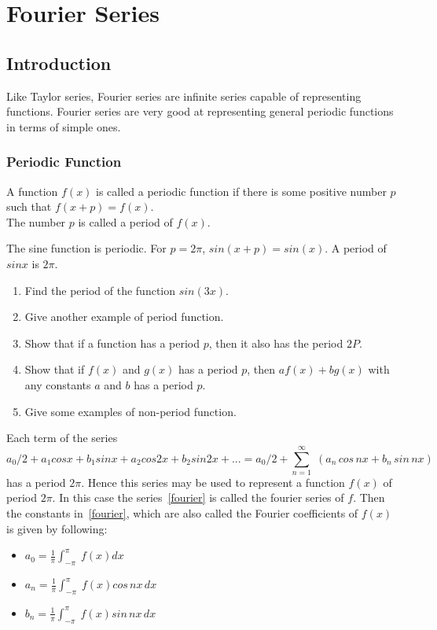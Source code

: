 \documentclass[aima331_lecturenotes_ku.tex]{subfiles}
\begin{document}
\chapter{Fourier Series}

\section{Introduction}
Like Taylor series, Fourier series are infinite series capable of representing functions. Fourier series are very good at representing general periodic functions in terms of simple ones.

\subsection{Periodic Function}
A function $f(x)$ is called a periodic function if there is some positive number $p$ such that $f(x+p)=f(x)$. \\
The number $p$ is called a period of $f(x)$.
\begin{example}
  The sine function is periodic. For $p=2\pi$, $sin(x+p) = sin(x)$. A period of $sinx$ is $2 \pi$.
\end{example}
\begin{enumerate}
\item Find the period of the function $sin(3x)$.
\item Give another example of period function.
\item Show that if a function has a period $p$, then it also has the period $2P$.
\item Show that if $f(x)$ and $g(x)$ has a period $p$, then $af(x)+bg(x)$ with any constants $a$ and $b$ has a period $p$.
\item Give some examples of non-period function.
\end{enumerate}
Each term of the series
\begin{equation}
  \label{fourier}
  a_0/2 + a_1cosx+b_1sinx + a_2cos2x+b_2sin2x + ... = a_0/2 + \sum_{n=1}^{\infty} \; ( a_n\, cos\,nx + b_n \, sin\,nx  )
\end{equation}
has a period $2\pi$. Hence this series may be used to represent a function $f(x)$ of period $2\pi$. In this case the series~\ref{fourier} is called the fourier series of $f$. Then the constants in~\ref{fourier}, which are also called the Fourier coefficients of $f(x)$ is given by following:
\begin{itemize}
\item $\displaystyle a_0 = \frac{1}{\pi} \int_{-\pi}^{\pi} \; f(x) dx$

\item $\displaystyle a_n = \frac{1}{\pi} \int_{-\pi}^{\pi} \; f(x)cos\,nx \, dx$

\item $\displaystyle b_n = \frac{1}{\pi} \int_{-\pi}^{\pi} \; f(x)sin\,nx \, dx$
\end{itemize}
\end{document}
